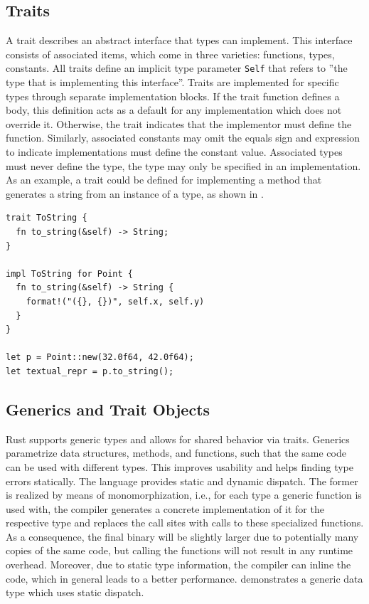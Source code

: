 \documentclass[paper=a4,%
  twoside,%
  BCOR4mm,%
  abstract=true,%
  toc=bibliography,%
  chapterprefix=true,%
  toc=bibliographynumbered,%
  open=right,%
  english,%
  pagesize=pdftex]{scrreprt}
\begin{document}
\subsection{Traits}
A trait describes an abstract interface that types can implement. This interface consists of associated items, which come in three varieties: functions, types, constants. All traits define an implicit type parameter \texttt{Self} that refers to ''the type that is implementing this interface''. Traits are implemented for specific types through separate implementation blocks. If the trait function defines a body, this definition acts as a default for any implementation which does not override it. Otherwise, the trait indicates that the implementor must define the function. Similarly, associated constants may omit the equals sign and expression to indicate implementations must define the constant value. Associated types must never define the type, the type may only be specified in an implementation. As an example, a trait could be defined for implementing a method that generates a string from an instance of a type, as shown in .

\begin{lstlisting}[style=boxed, caption={Trait definition and implementation for the \texttt{Point} data type from \Cref{lst:example-struct-enum}}, label=lst:example-trait]
trait ToString {
  fn to_string(&self) -> String;
}

impl ToString for Point {
  fn to_string(&self) -> String {
    format!("({}, {})", self.x, self.y)
  }
}

let p = Point::new(32.0f64, 42.0f64);
let textual_repr = p.to_string();
\end{lstlisting}


\subsection{Generics and Trait Objects}
Rust supports generic types and allows for shared behavior via traits. Generics parametrize data structures, methods, and functions, such that the same code can be used with different types. This improves usability and helps finding type errors statically. The language provides static and dynamic dispatch. The former is realized by means of monomorphization, i.e., for each type a generic function is used with, the compiler generates a concrete implementation of it for the respective type and replaces the call sites with calls to these specialized functions. As a consequence, the final binary will be slightly larger due to potentially many copies of the same code, but calling the functions will not result in any runtime overhead. Moreover, due to static type information, the compiler can inline the code, which in general leads to a better performance.  demonstrates a generic data type which uses static dispatch.
\end{document}
